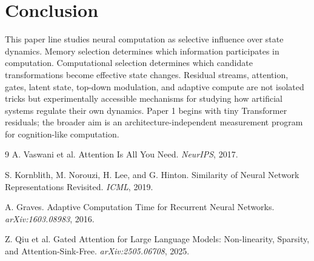 \documentclass[10pt]{article}
\begin{document}
\section{Conclusion}
This paper line studies neural computation as selective influence over state dynamics. Memory selection determines which information participates in computation. Computational selection determines which candidate transformations become effective state changes. Residual streams, attention, gates, latent state, top-down modulation, and adaptive compute are not isolated tricks but experimentally accessible mechanisms for studying how artificial systems regulate their own dynamics. Paper 1 begins with tiny Transformer residuals; the broader aim is an architecture-independent measurement program for cognition-like computation.

\begin{thebibliography}{9}
A. Vaswani et al.
\newblock Attention Is All You Need.
\newblock \emph{NeurIPS}, 2017.

S. Kornblith, M. Norouzi, H. Lee, and G. Hinton.
\newblock Similarity of Neural Network Representations Revisited.
\newblock \emph{ICML}, 2019.

A. Graves.
\newblock Adaptive Computation Time for Recurrent Neural Networks.
\newblock \emph{arXiv:1603.08983}, 2016.

Z. Qiu et al.
\newblock Gated Attention for Large Language Models: Non-linearity, Sparsity, and Attention-Sink-Free.
\newblock \emph{arXiv:2505.06708}, 2025.
\end{thebibliography}
\end{document}
